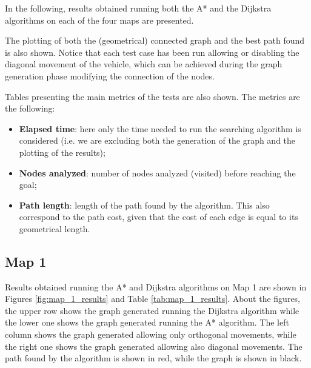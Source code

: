 In the following, results obtained running both the A* and the Dijkstra algorithms on each of the four maps are presented.

The plotting of both the (geometrical) connected graph and the best path found is also shown.
Notice that each test case has been run allowing or disabling the diagonal movement of the vehicle, which can be achieved during the graph generation phase modifying the connection of the nodes.

Tables presenting the main metrics of the tests are also shown.
The metrics are the following:

\begin{itemize}
    \item \textbf{Elapsed time}: here only the time needed to run the searching algorithm is considered (i.e. we are excluding both the generation of the graph and the plotting of the results);
    \item \textbf{Nodes analyzed}: number of nodes analyzed (visited) before reaching the goal;
    \item \textbf{Path length}: length of the path found by the algorithm. This also correspond to the path cost, given that the cost of each edge is equal to its geometrical length.
\end{itemize}



\subsection{Map 1}
\label{subsec:map_1}

Results obtained running the A* and Dijkstra algorithms on Map 1 are shown in Figures \ref{fig:map_1_results} and Table \ref{tab:map_1_results}.
About the figures, the upper row shows the graph generated running the Dijkstra algorithm while the lower one shows the graph generated running the A* algorithm.
The left column shows the graph generated allowing only orthogonal movements, while the right one shows the graph generated allowing also diagonal movements.
The path found by the algorithm is shown in red, while the graph is shown in black.

